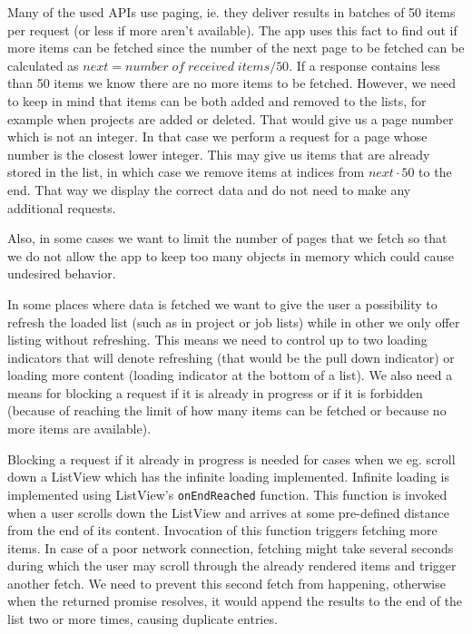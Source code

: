 Many of the used APIs use paging, ie. they deliver results in batches of 50 items per request (or less if more aren't available). The app uses this fact to find out if more items can be fetched since the number of the next page to be fetched can be calculated as $next = number \;of\; received \;items / 50$. If a response contains less than 50 items we know there are no more items to be fetched. However, we need to keep in mind that items can be both added and removed to the lists, for example when projects are added or deleted. That would give us a page number which is not an integer. In that case we perform a request for a page whose number is the closest lower integer. This may give us items that are already stored in the list, in which case we remove items at indices from $next \cdot 50$ to the end. That way we display the correct data and do not need to make any additional requests.

Also, in some cases we want to limit the number of pages that we fetch so that we do not allow the app to keep too many objects in memory which could cause undesired behavior. 

In some places where data is fetched we want to give the user a possibility to refresh the loaded list (such as in project or job lists) while in other we only offer listing without refreshing. This means we need to control up to two loading indicators that will denote refreshing (that would be the pull down indicator) or loading more content (loading indicator at the bottom of a list). We also need a means for blocking a request if it is already in progress or if it is forbidden (because of reaching the limit of how many items can be fetched or because no more items are available). 

Blocking a request if it already in progress is needed for cases when we eg. scroll down a ListView which has the infinite loading implemented. Infinite loading is implemented using ListView’s \texttt{onEndReached} function. This function is invoked when a user scrolls down the ListView and arrives at some pre-defined distance from the end of its content. Invocation of this function triggers fetching more items. In case of a poor network connection, fetching might take several seconds during which the user may scroll through the already rendered items and trigger another fetch. We need to prevent this second fetch from happening, otherwise when the returned promise resolves, it would append the results to the end of the list two or more times, causing duplicate entries.
 

